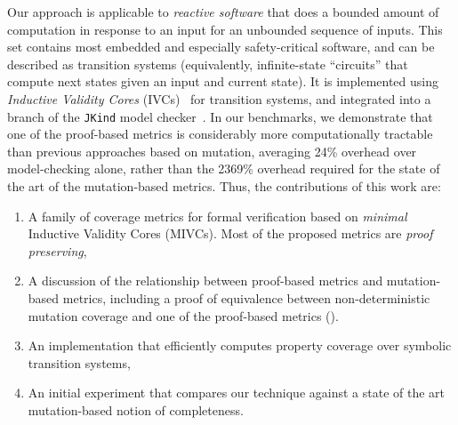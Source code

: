Our approach is applicable to {\em reactive software} that does a bounded amount of computation in response to an input for an unbounded sequence of inputs.  This set contains most embedded and especially safety-critical software, and can be described as transition systems (equivalently, infinite-state ``circuits'' that compute next states given an input and current state).
It is implemented using {\em Inductive Validity Cores} (IVCs)~\cite{Ghass16} for transition systems, and integrated into a branch of the \texttt{JKind} model checker~\cite{jkind}.  In our benchmarks, we demonstrate that one of the proof-based metrics is considerably more computationally tractable than previous approaches based on mutation, averaging 24\% overhead over model-checking alone, rather than the 2369\% overhead required for the state of the art of the mutation-based metrics.
Thus, the contributions of this work are:
\begin{enumerate}
\item A family of coverage metrics for formal verification based on \emph{minimal} Inductive Validity Cores (MIVCs).  Most of the proposed metrics are {\em proof preserving},
\item A discussion of the relationship between proof-based metrics and mutation-based metrics, including a proof of equivalence between non-deterministic mutation coverage and one of the proof-based metrics (\mustcov).
\item An implementation that efficiently computes property coverage over symbolic transition systems,
\item An initial experiment that compares our technique against a state of the art mutation-based notion of completeness.
\end{enumerate}


\iffalse
The rest of the paper is organized as follows.  In Section~\ref{sec:example}, we present a running example to illustrate the concepts formalized throughout the paper.  In Section~\ref{sec:background}, we provide the formal preliminaries for the approach and some background on mutation-based coverage notions.  Section~\ref{sec:method} presents proof-based coverage metrics.
Section~\ref{sec:illust} illustrates the assessment of requirements completeness with the new metrics. Section~\ref{sec:impl} provides detail on implementation. Section~\ref{sec:experiments} describes an experiment to evaluate our algorithm.
Section~\ref{sec:discussion} provides a discussion.  In Section~\ref{sec:related}, we cover related work.  Finally, Section~\ref{sec:conclusion} mentions some conclusions.
\fi
